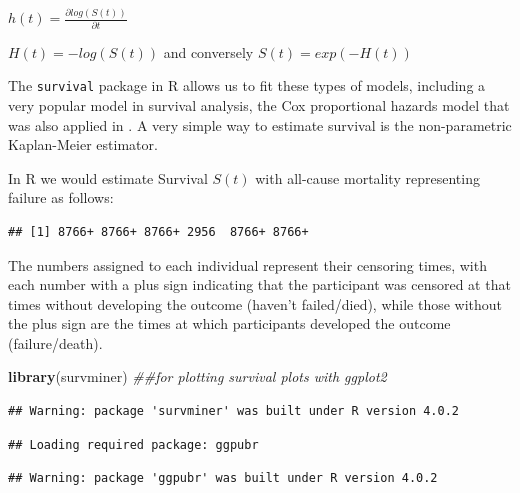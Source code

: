 \documentclass[
]{book}
\newenvironment{Shaded}{\begin{snugshade}}{\end{snugshade}}
\newcommand{\CommentTok}[1]{\textcolor[rgb]{0.56,0.35,0.01}{\textit{#1}}}
\newcommand{\KeywordTok}[1]{\textcolor[rgb]{0.13,0.29,0.53}{\textbf{#1}}}
\newcommand{\NormalTok}[1]{#1}
\newcommand{\OperatorTok}[1]{\textcolor[rgb]{0.81,0.36,0.00}{\textbf{#1}}}
\begin{document}
\(h(t)=\frac{\partial log(S(t))}{\partial t}\)

\(H(t)=-log(S(t))\) and conversely \(S(t)=exp(-H(t))\)

The \texttt{survival} package in R allows us to fit these types of models, including a very popular model in survival analysis, the Cox proportional hazards model that was also applied in \citet{wong1989risk}. A very simple way to estimate survival is the non-parametric Kaplan-Meier estimator.

In R we would estimate Survival \(S(t)\) with all-cause mortality representing failure as follows:

\begin{Shaded}
\end{Shaded}

\begin{verbatim}
## [1] 8766+ 8766+ 8766+ 2956  8766+ 8766+
\end{verbatim}

The numbers assigned to each individual represent their censoring times, with each number with a plus sign indicating that the participant was censored at that times without developing the outcome (haven't failed/died), while those without the plus sign are the times at which participants developed the outcome (failure/death).

\begin{Shaded}
\begin{Highlighting}[]
\KeywordTok{library}\NormalTok{(survminer) }\CommentTok{##for plotting survival plots with ggplot2}
\end{Highlighting}
\end{Shaded}

\begin{verbatim}
## Warning: package 'survminer' was built under R version 4.0.2
\end{verbatim}

\begin{verbatim}
## Loading required package: ggpubr
\end{verbatim}

\begin{verbatim}
## Warning: package 'ggpubr' was built under R version 4.0.2
\end{verbatim}
\end{document}
